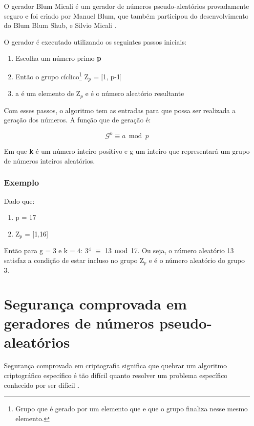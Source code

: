 O gerador Blum Micali é um gerador de números pseudo-aleatórios provadamente seguro e foi criado por Manuel Blum, que também participou do desenvolvimento do Blum Blum Shub, e Silvio Micali \cite{josefin-martin}.

O gerador é executado utilizando os seguintes passos iniciais:

\begin{enumerate}
	\item Escolha um número primo \textbf{p}
	\item Então o grupo cíclico\footnote{Grupo que é gerado por um elemento que e que o grupo finaliza nesse mesmo elemento.} Z$_p$ = [1, p-1]
	\item a é um elemento de Z$_p$ e é o número aleatório resultante
\end{enumerate}


Com esses passos, o algoritmo tem as entradas para que possa ser realizada a geração dos números. A função que de geração é:

\begin{equation}
	\mathcal{G}^k \equiv a \bmod p
\end{equation}

Em que \textbf{k} é um número inteiro positivo e g um inteiro que representará um grupo de números inteiros aleatórios.

\subsubsection{Exemplo}

Dado que:

\begin{enumerate}
	\item p = 17
	\item Z$_p$ = [1,16]
\end{enumerate}

Então para g = 3 e k = 4: 3$^4$ $\equiv$ 13 $\bmod$ 17. Ou seja, o número aleatório 13 satisfaz a condição de estar incluso no grupo Z$_p$ e é o número aleatório do grupo 3.

\section{Segurança comprovada em geradores de números pseudo-aleatórios}
\label{security-of-prng}

Segurança comprovada em criptografia significa que quebrar um algoritmo criptográfico específico é tão difícil quanto resolver um problema específico conhecido por ser difícil \cite{josefin-martin}.

